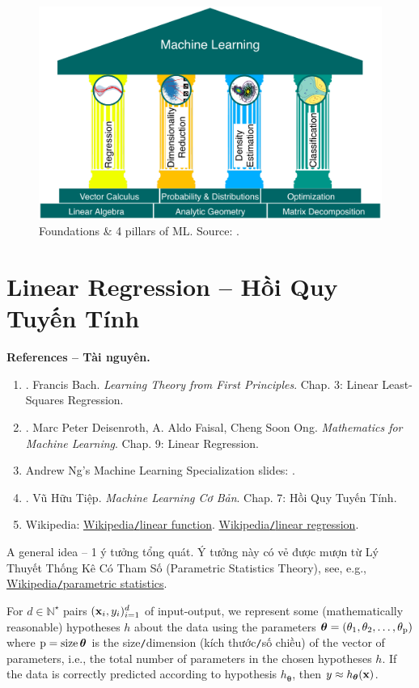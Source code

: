 \documentclass{article}
\begin{document}
\begin{figure}[H]
	\centering
	\includegraphics[width=12cm]{4_ML_pillars}
	\caption{Foundations \& 4 pillars of ML. Source: \cite[Fig. 1.1, p. 14]{Deisenroth_Faisal_Ong2023}.}
\end{figure}

\section{Linear Regression -- Hồi Quy Tuyến Tính}
\textbf{\textsf{References -- Tài nguyên.}}
\begin{enumerate}
	\item \cite{Bach2024}. {\sc Francis Bach}. {\it Learning Theory from First Principles}. Chap. 3: Linear Least-Squares Regression.
	\item \cite{Deisenroth_Faisal_Ong2023}. {\sc Marc Peter Deisenroth, A. Aldo Faisal, Cheng Soon Ong}. {\it Mathematics for Machine Learning}. Chap. 9: Linear Regression.
	\item {\sc Andrew Ng}'s Machine Learning Specialization slides: \url{}.
	\item \cite{Tiep_ML_co_ban}. {\sc Vũ Hữu Tiệp}. {\it Machine Learning Cơ Bản}. Chap. 7: Hồi Quy Tuyến Tính.
	\item Wikipedia: \href{https://en.wikipedia.org/wiki/Linear_function}{Wikipedia{\tt/}linear function}. \href{https://en.wikipedia.org/wiki/Linear_regression}{Wikipedia{\tt/}linear regression}.
\end{enumerate}
{\sf A general idea -- 1 ý tưởng tổng quát.} Ý tưởng này có vẻ được mượn từ Lý Thuyết Thống Kê Có Tham Số (Parametric Statistics Theory), see, e.g., \href{https://en.wikipedia.org/wiki/Parametric_statistics}{Wikipedia{\tt/}parametric statistics}.

For $d\in\mathbb{N}^\star$ pairs $({\bf x}_i,y_i)_{i=1}^d$ of input-output, we represent some (mathematically reasonable) hypotheses $h$ about the data using the parameters $\boldsymbol{\theta} = (\theta_1,\theta_2,\ldots,\theta_{\rm p})$ where ${\rm p} = \operatorname{size}\boldsymbol{\theta}$ is the size{\tt/}dimension (kích thước{\tt/}số chiều) of the vector of parameters, i.e., the total number of parameters in the chosen hypotheses $h$. If the data is correctly predicted according to hypothesis $h_{\boldsymbol{\theta}}$, then $y\approx h_{\boldsymbol{\theta}}({\bf x})$.
\end{document}
